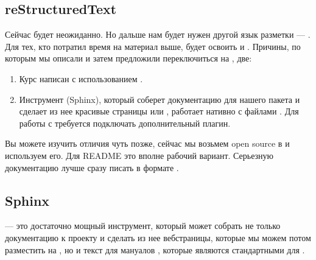 \documentclass[letterpaper,10pt,russian]{sphinxmanual}
\begin{document}
\subsection{reStructuredText}
\label{\detokenize{educational_materials/docs/content:restructuredtext}}
\sphinxAtStartPar
Сейчас будет неожиданно. Но дальше нам будет нужен другой язык разметки — . Для тех, кто потратил время на материал выше, будет  освоить и . Причины, по которым мы описали  и затем предложили переключиться на , две:
\begin{enumerate}
%
\item {} 
\sphinxAtStartPar
Курс написан с использованием .

\item {} 
\sphinxAtStartPar
Инструмент (Sphinx), который соберет документацию для нашего пакета и сделает из нее красивые \sphinxhyphen{}страницы или , работает нативно с файлами . Для работы с  требуется подключать дополнительный плагин.

\end{enumerate}

\sphinxAtStartPar
Вы можете изучить отличия чуть позже, сейчас мы возьмем open source   в  и используем его. Для README это вполне рабочий вариант. Серьезную документацию лучше сразу писать в формате .


\subsection{Sphinx}
\label{\detokenize{educational_materials/docs/content:sphinx}}
\sphinxAtStartPar
{} — это достаточно мощный инструмент, который может собрать не только документацию к проекту и сделать из нее веб\sphinxhyphen{}страницы, которые мы можем потом разместить на , но и текст для мануалов , которые являются стандартными для .
\end{document}
